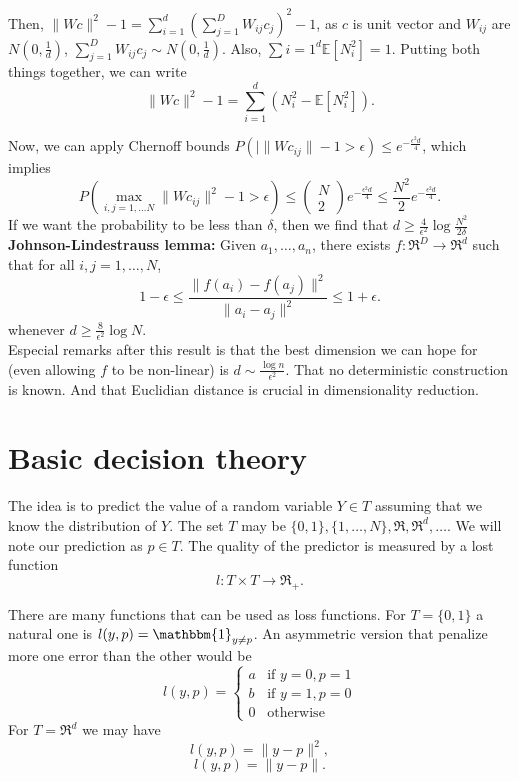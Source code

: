 \documentclass[11pt, english]{article}
\begin{document}
Then, $\| W c\|^2-1=\sum\limits_{i=1}^d\left(\sum\limits_{j=1}^DW_{ij}c_j\right)^2-1$, as $c$ is unit vector and $W_{ij}$ are $N(0,\frac{1}{d})$, $\sum\limits_{j=1}^DW_{ij}c_j\sim N(0,\frac{1}{d})$. Also, $\sum\limits{i=1}^d\mathbb{E}[N_i^2]=1$. Putting both things together, we can write 
\begin{equation}
	\|Wc\|^2-1=\sum\limits_{i=1}^d\left(N_i^2-\mathbb{E}[N_i^2]\right).
\end{equation} 

Now, we can apply Chernoff bounds
$P(|\|Wc_{ij}\|-1>\epsilon)\leq e^{-\frac{\epsilon^2d}{4}}$, which implies
\begin{equation}
	P(\underset{i,j=1,\dots N}{\max}\|Wc_{ij}\|^2-1>\epsilon)\leq \left(\begin{array}{c}
	N\\
	2
	\end{array}\right)e^{-\frac{\epsilon^2d}{4}}\leq \frac{N^2}{2}e^{-\frac{\epsilon^2d}{4}}.
\end{equation}
If we want the probability to be less than $\delta$, then we find that $d\geq \frac{4}{\epsilon^2}\log\frac{N^2}{2\delta}$\\

\textbf{Johnson-Lindestrauss lemma:}
Given $a_1,\dots,a_n$, there exists $f:\Re^D\rightarrow\Re^d$ such that for all $i,j=1,\dots,N$, 
\begin{equation}
	1-\epsilon\leq\frac{\| f(a_i)-f(a_j)\|^2}{\|a_i-a_j\|^2}\leq 1+\epsilon.
\end{equation}
whenever $d\geq \frac{8}{\epsilon^2}\log N$.\\

Especial remarks after this result is that the best dimension we can hope for (even allowing $f$ to be non-linear) is $d\sim\frac{\log n}{\epsilon^2}$. That no deterministic construction is known. And that Euclidian distance is crucial in dimensionality reduction.


\section{Basic decision theory}

The idea is to predict the value of a random variable $Y\in T$ assuming that we know the distribution of $Y$. The set $ T$ may be $\{0,1\},\{1,\dots,N\},\Re,\Re^d,\dots$. We will note our prediction as $p\in T$. The quality of the predictor is measured by a lost function
$$l: T\times T\rightarrow\Re_{+}.$$

There are many functions that can be used as loss functions. For $ T=\{0,1\}$ a natural one is $l(y,p)=\mathbbm{1}_{y\neq p}$. An asymmetric version that penalize more one error than the other would be
$$l(y,p)=\left\{\begin{array}{ll}
a & \text{if } y=0,p=1\\
b & \text{if } y=1,p=0\\
0 & \text{otherwise}
\end{array}\right.$$
For $ T=\Re^d$ we may have 
$$l(y,p)=\|y-p\|^2,$$
$$l(y,p)=\|y-p\|.$$
\end{document}
